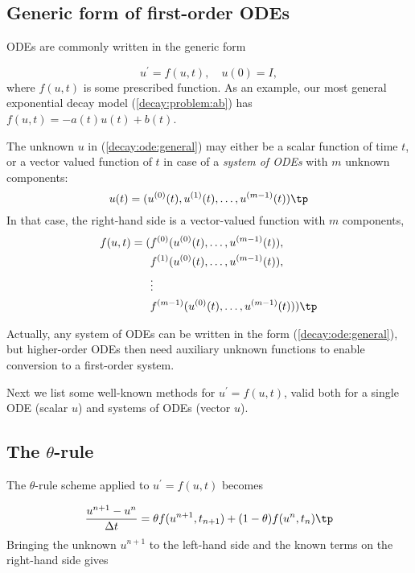 \documentclass[graybox,sectrefs,envcountresetchap,open=right,final]{svmonodo}
\begin{document}
\subsection{Generic form of first-order ODEs}

ODEs are commonly written in the generic form

\begin{equation}
u^{\prime} = f(u,t),\quad u(0)=I,
\label{decay:ode:general}
\end{equation}
where $f(u,t)$  is some prescribed function.
As an example, our most
general exponential decay model (\ref{decay:problem:ab}) has
$f(u,t)=-a(t)u(t) + b(t)$.

The unknown $u$ in (\ref{decay:ode:general}) may either be
a scalar function of time $t$, or a vector valued function of $t$ in
case of a \emph{system of ODEs} with $m$ unknown components:
\[ u(t) = (u^{(0)}(t),u^{(1)}(t),\ldots,u^{(m-1)}(t)) \tp  \]
In that case, the right-hand side is a vector-valued function with $m$
components,
\begin{align*}
f(u, t) = ( & f^{(0)}(u^{(0)}(t),\ldots,u^{(m-1)}(t)),\\ 
            & f^{(1)}(u^{(0)}(t),\ldots,u^{(m-1)}(t)),\\ 
            & \vdots\\ 
            & f^{(m-1)}(u^{(0)}(t),\ldots,u^{(m-1)}(t)))
\tp
\end{align*}

Actually, any system of ODEs can
be written in the form (\ref{decay:ode:general}), but higher-order
ODEs then need auxiliary unknown functions to enable conversion to
a first-order system.


Next we list some well-known methods for $u^{\prime}=f(u,t)$, valid both for
a single ODE (scalar $u$) and systems of ODEs (vector $u$).


\subsection{The $\theta$-rule}

The $\theta$-rule scheme applied to $u^{\prime}=f(u,t)$ becomes

\begin{equation}
\frac{u^{n+1}-u^n}{\Delta t} = \theta f(u^{n+1},t_{n+1}) +
(1-\theta)f(u^n, t_n)\tp
\label{decay:fd2:theta}
\end{equation}
Bringing the unknown $u^{n+1}$ to the left-hand side and the known terms
on the right-hand side gives
\end{document}
